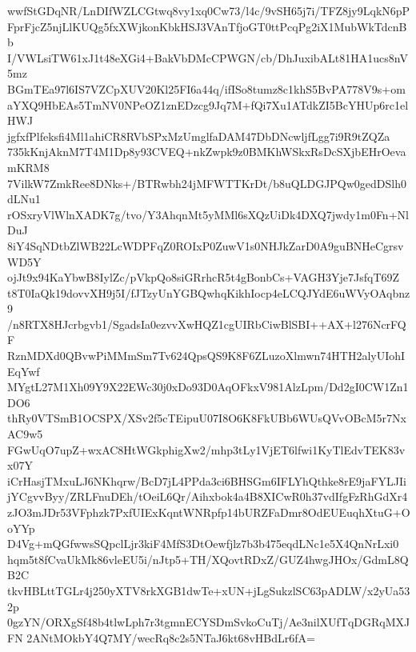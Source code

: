 wwfStGDqNR/LnDIfWZLCGtwq8vy1xq0Cw73/l4c/9vSH65j7i/TFZ8jy9LqkN6pP
FprFjcZ5njLlKUQg5fxXWjkonKbkHSJ3VAnTfjoGT0ttPcqPg2iX1MubWkTdcnBb
I/VWLsiTW61xJ1t48eXGi4+BakVbDMcCPWGN/cb/DhJuxibALt81HA1ucs8nV5mz
BGmTEa97l6IS7VZCpXUV20Kl25FI6a44q/ifISo8tumz8c1khS5BvPA778V9s+om
aYXQ9HbEAs5TmNV0NPeOZ1znEDzcg9Jq7M+fQi7Xu1ATdkZI5BcYHUp6rc1elHWJ
jgfxfPlfeksfi4Ml1ahiCR8RVbSPxMzUmglfaDAM47DbDNcwljfLgg7i9R9tZQZa
735kKnjAknM7T4M1Dp8y93CVEQ+nkZwpk9z0BMKhWSkxRsDcSXjbEHrOevamKRM8
7VilkW7ZmkRee8DNks+/BTRwbh24jMFWTTKrDt/b8uQLDGJPQw0gedDSlh0dLNu1
rOSxryVlWlnXADK7g/tvo/Y3AhqnMt5yMMl6sXQzUiDk4DXQ7jwdy1m0Fn+NlDuJ
8iY4SqNDtbZlWB22LcWDPFqZ0ROIxP0ZuwV1s0NHJkZarD0A9guBNHeCgrsvWD5Y
ojJt9x94KaYbwB8IylZc/pVkpQo8siGRrhcR5t4gBonbCs+VAGH3Yje7JsfqT69Z
t8T0IaQk19dovvXH9j5I/fJTzyUnYGBQwhqKikhIocp4eLCQJYdE6uWVyOAqbnz9
/n8RTX8HJcrbgvb1/SgadsIa0ezvvXwHQZ1cgUIRbCiwBlSBI++AX+l276NcrFQF
RznMDXd0QBvwPiMMmSm7Tv624QpsQS9K8F6ZLuzoXlmwn74HTH2alyUIohIEqYwf
MYgtL27M1Xh09Y9X22EWc30j0xDo93D0AqOFkxV981AlzLpm/Dd2gI0CW1Zn1DO6
thRy0VTSmB1OCSPX/XSv2f5cTEipuU07I8O6K8FkUBb6WUsQVvOBcM5r7NxAC9w5
FGwUqO7upZ+wxAC8HtWGkphigXw2/mhp3tLy1VjET6lfwi1KyTlEdvTEK83vx07Y
iCrHasjTMxuLJ6NKhqrw/BcD7jL4PPda3ci6BHSGm6IFLYhQthke8rE9jaFYLJIi
jYCgvvByy/ZRLFnuDEh/tOeiL6Qr/Aihxbok4a4B8XICwR0h37vdIfgFzRhGdXr4
zJO3mJDr53VFphzk7PxfUIExKqntWNRpfp14bURZFaDmr8OdEUEuqhXtuG+OoYYp
D4Vg+mQGfwwsSQpclLjr3kiF4MfS3DtOewfjlz7b3b475eqdLNc1e5X4QnNrLxi0
hqm5t8fCvaUkMk86vleEU5i/nJtp5+TH/XQovtRDxZ/GUZ4hwgJHOx/GdmL8QB2C
tkvHBLttTGLr4j250yXTV8rkXGB1dwTe+xUN+jLgSukzlSC63pADLW/x2yUa532p
0gzYN/ORXgSf48b4tlwLph7r3tgmnECYSDmSvkoCuTj/Ae3nilXUfTqDGRqMXJFN
2ANtMOkbY4Q7MY/wecRq8c2s5NTaJ6kt68vHBdLr6fA=
